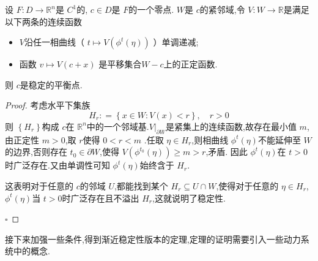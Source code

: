 \documentclass[lang=cn,12pt,color=green,fontset=none]{elegantbook}
\begin{document}
\begin{theorem}\label{thm:Lyapnov-func-cri-stab}
    设 $ F:D\to \mathbb{R} ^{n} $是 $ C^{1} $的, $ c \in D $是 $ F $的一个零点. $ W $是 $ c $的紧邻域,令 $ V:W\to \mathbb{R}  $是满足以下两条的连续函数 
    \begin{itemize}
        \item $ V $沿任一相曲线（ $ t \mapsto V\left( \phi ^{t}\left( \eta  \right)  \right)  $ ）单调递减;
        \item 函数 $ v\mapsto V\left( c+ x \right)  $ 是平移集合$ W-c $上的正定函数.
    \end{itemize}
        则 $ c $是稳定的平衡点. 
\end{theorem}
\begin{proof}
    考虑水平下集族 $$
    H_{r}: = \left\{ x \in W:V\left( x \right)<r  \right\},\quad r>0
    $$则 $ \left\{ H_{r} \right\} $构成 $ c $在 $ \mathbb{R} ^{n} $中的一个邻域基.$ V|_{\partial W} $是紧集上的连续函数,故存在最小值 $ m $,由正定性 $ m>0 $,取 $ r $使得 $ 0<r<m $ .任取 $ \eta  \in H_{r} $,则相曲线 $ \phi ^{t}\left( \eta  \right)  $不能延伸至 $ W $的边界,否则存在 $ t_0 \in \partial W $,使得  $ V \left( \phi ^{t_0}\left( \eta  \right)  \right) \ge m> r $,矛盾.   
    因此 $ \phi ^{t}\left( \eta  \right)  $在 $ t>0 $时广泛存在.又由单调性可知 $ \phi ^{t}\left( \eta  \right)  $始终含于 $ H_{r} $.

    这表明对于任意的 $ c $的邻域 $ U $,都能找到某个 $ H_{r}\subseteq  U\cap W $,使得对于任意的 $ \eta  \in H_{r} $, $ \phi ^{t}\left( \eta  \right)  $当 $ t>0 $时广泛存在且不溢出 $ H_{r} $,这就说明了稳定性.      

    \hfill $\square$
\end{proof}


接下来加强一些条件,得到渐近稳定性版本的定理,定理的证明需要引入一些动力系统中的概念.
\end{document}
